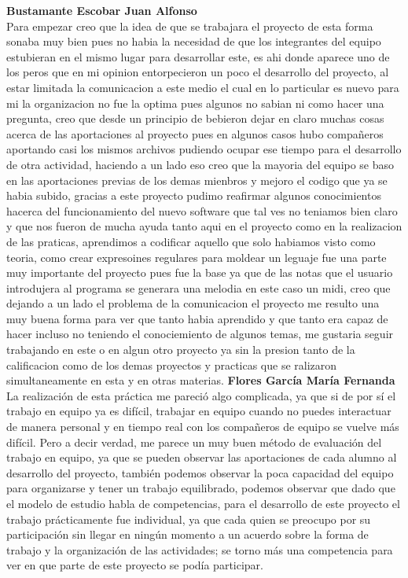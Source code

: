 \documentclass[12pt]{article}
\begin{document}
{\bf Bustamante Escobar Juan Alfonso}\\
Para empezar creo que la idea de que se trabajara el proyecto de esta forma sonaba muy bien pues no habia la necesidad de que los integrantes del equipo estubieran en el mismo lugar para desarrollar este, es ahi donde aparece uno de los peros que en mi opinion entorpecieron un poco el desarrollo del proyecto, al estar limitada la comunicacion a este medio el cual en lo particular es nuevo para mi la organizacion no fue la optima pues algunos no sabian ni como hacer una pregunta, creo que desde un principio de bebieron dejar en claro muchas cosas acerca de las aportaciones al proyecto pues en algunos casos hubo compañeros aportando casi los mismos archivos pudiendo ocupar ese tiempo para el desarrollo de otra actividad, haciendo a un lado eso creo que la mayoria del equipo se baso en las aportaciones previas de los demas mienbros y mejoro el codigo que ya se habia subido, gracias a este proyecto pudimo reafirmar algunos conocimientos hacerca del funcionamiento del nuevo software que tal ves no teniamos bien claro
 y que nos fueron de mucha ayuda tanto aqui en el proyecto como en la realizacion de las praticas, aprendimos a codificar aquello que solo habiamos visto como teoria, como crear expresoines regulares para moldear un leguaje fue una parte muy importante del proyecto pues fue la base ya que de las notas que el usuario introdujera al programa se generara una melodia en este caso un midi, creo que dejando a un lado el problema de la comunicacion el proyecto me resulto una muy buena forma para ver que tanto habia aprendido y que tanto era capaz de hacer incluso no teniendo el conociemiento de algunos temas, me gustaria seguir trabajando en este o en algun otro proyecto ya sin la presion tanto de la calificacion como de los demas proyectos y practicas que se ralizaron simultaneamente en esta y en otras materias.
{\bf Flores García María Fernanda}\\
La realización de esta práctica me pareció algo complicada, ya que si de por sí el trabajo en equipo ya es difícil, trabajar en equipo cuando no puedes interactuar de manera personal y en tiempo real con los compañeros de equipo se vuelve más difícil. Pero a decir verdad, me parece un muy buen método de evaluación del trabajo en equipo, ya que se pueden observar  las aportaciones de cada alumno al desarrollo del proyecto, también podemos observar la poca capacidad del equipo para organizarse y tener un trabajo equilibrado, podemos observar que dado que el modelo de estudio habla de competencias, para el desarrollo de este proyecto el trabajo prácticamente fue individual, ya que cada quien se preocupo por su participación sin llegar en ningún momento a un acuerdo sobre la forma de trabajo y la organización de las actividades; se torno más una competencia para ver en que parte de este proyecto se podía participar.
\end{document}
